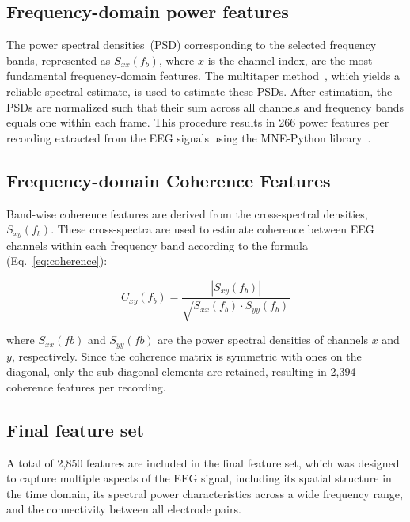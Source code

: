 \documentclass{bachelor2025eng}
\begin{document}
        \subsection{Frequency-domain power features}
            The power spectral densities~(PSD) corresponding to the selected frequency bands, represented as \(S_{xx}(f_b)\), where \(x\) is the channel index, are the most fundamental frequency-domain features. The multitaper method~\cite{Thomson1982}, which yields a reliable spectral estimate, is used to estimate these PSDs. After estimation, the PSDs are normalized such that their sum across all channels and frequency bands equals one within each frame. This procedure results in 266 power features per recording extracted from the EEG signals using the MNE-Python library~\cite{Gramfort2013}.

        \subsection{Frequency-domain Coherence Features}
            Band-wise coherence features are derived from the cross-spectral densities, \(S_{xy}(f_b)\). These cross-spectra are used to estimate coherence between EEG channels within each frequency band according to the formula (Eq.~\ref{eq:coherence}): 
            
            \begin{equation}
            \label{eq:coherence}
            C_{xy}(f_b) = \frac{|S_{xy}(f_b)|}{\sqrt{S_{xx}(f_b) \cdot S_{yy}(f_b)}}
            \end{equation}

            \noindent
            where \(S_{xx}(fb)\) and \(S_{yy}(fb)\) are the power spectral densities of channels \(x\) and \(y\), respectively. Since the coherence matrix is symmetric with ones on the diagonal, only the sub-diagonal elements are retained, resulting in 2,394 coherence features per recording.

        \subsection{Final feature set}
            A total of 2,850 features are included in the final feature set, which was designed to capture multiple aspects of the EEG signal, including its spatial structure in the time domain, its spectral power characteristics across a wide frequency range, and the  connectivity between all electrode pairs.
\end{document}
